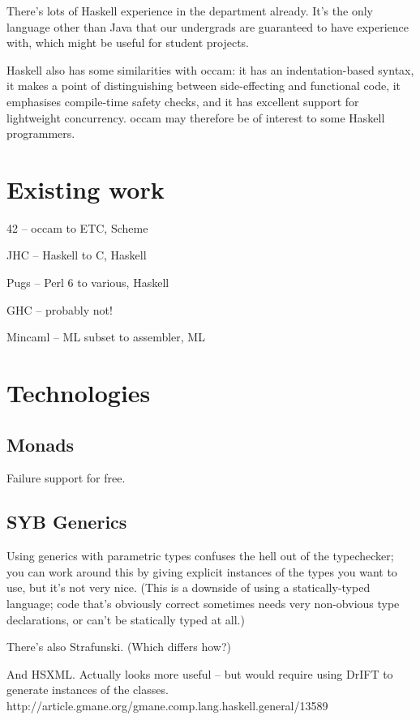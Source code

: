 \documentclass[a4paper,12pt]{article}
\def\occam{{\sffamily occam}\xspace}
\begin{document}
There's lots of Haskell experience in the department already. It's the
only language other than Java that our undergrads are guaranteed to have
experience with, which might be useful for student projects.

Haskell also has some similarities with \occam: it has an
indentation-based syntax, it makes a point of distinguishing between
side-effecting and functional code, it emphasises compile-time safety
checks, and it has excellent support for lightweight concurrency. \occam
may therefore be of interest to some Haskell programmers.

\section{Existing work}

42 -- \occam to ETC, Scheme

JHC -- Haskell to C, Haskell

Pugs -- Perl 6 to various, Haskell

GHC -- probably not!

Mincaml -- ML subset to assembler, ML

\section{Technologies}

\subsection{Monads}

Failure support for free.

\subsection{SYB Generics}

\cite{syb1}

\label{gen-par-prob} Using generics with parametric types confuses the
hell out of the typechecker; you can work around this by giving explicit
instances of the types you want to use, but it's not very nice.
(This is a downside of using a statically-typed language; code that's
obviously correct sometimes needs very non-obvious type declarations, or
can't be statically typed at all.)

There's also Strafunski. (Which differs how?)

And HSXML. Actually looks more useful -- but would require using DrIFT
to generate instances of the classes.
http://article.gmane.org/gmane.comp.lang.haskell.general/13589
\end{document}
